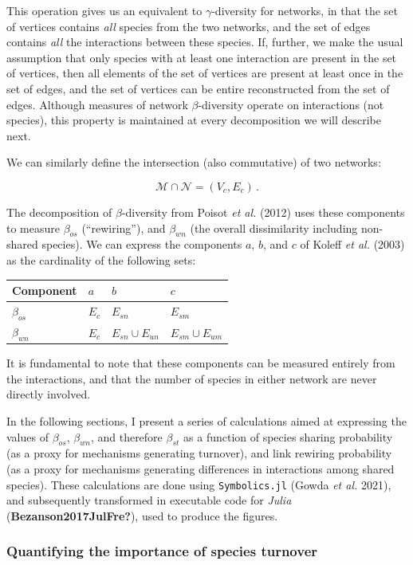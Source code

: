 \documentclass[10pt,oneside]{article}
\begin{document}
This operation gives us an equivalent to \(\gamma\)-diversity for
networks, in that the set of vertices contains \emph{all} species from
the two networks, and the set of edges contains \emph{all} the
interactions between these species. If, further, we make the usual
assumption that only species with at least one interaction are present
in the set of vertices, then all elements of the set of vertices are
present at least once in the set of edges, and the set of vertices can
be entire reconstructed from the set of edges. Although measures of
network \(\beta\)-diversity operate on interactions (not species), this
property is maintained at every decomposition we will describe next.

We can similarly define the intersection (also commutative) of two
networks:

\[\mathcal{M} \cap \mathcal{N} = (V_c, E_c)\,.\]

The decomposition of \(\beta\)-diversity from Poisot \emph{et al.}
(2012) uses these components to measure \(\beta_{os}\) (``rewiring''),
and \(\beta_{wn}\) (the overall dissimilarity including non-shared
species). We can express the components \(a\), \(b\), and \(c\) of
Koleff \emph{et al.} (2003) as the cardinality of the following sets:

\begin{longtable}[]{@{}llll@{}}
\toprule
Component & \(a\) & \(b\) & \(c\)\tabularnewline
\midrule
\endhead
\(\beta_{os}\) & \(E_c\) & \(E_{sn}\) & \(E_{sm}\)\tabularnewline
\(\beta_{wn}\) & \(E_c\) & \(E_{sn} \cup E_{un}\) &
\(E_{sm} \cup E_{um}\)\tabularnewline
\bottomrule
\end{longtable}

It is fundamental to note that these components can be measured entirely
from the interactions, and that the number of species in either network
are never directly involved.

In the following sections, I present a series of calculations aimed at
expressing the values of \(\beta_{os}\), \(\beta_{wn}\), and therefore
\(\beta_{st}\) as a function of species sharing probability (as a proxy
for mechanisms generating turnover), and link rewiring probability (as a
proxy for mechanisms generating differences in interactions among shared
species). These calculations are done using \texttt{Symbolics.jl} (Gowda
\emph{et al.} 2021), and subsequently transformed in executable code for
\emph{Julia} (\textbf{Bezanson2017JulFre?}), used to produce the
figures.

\hypertarget{quantifying-the-importance-of-species-turnover}{%
\subsubsection{Quantifying the importance of species
turnover}\label{quantifying-the-importance-of-species-turnover}}
\end{document}
